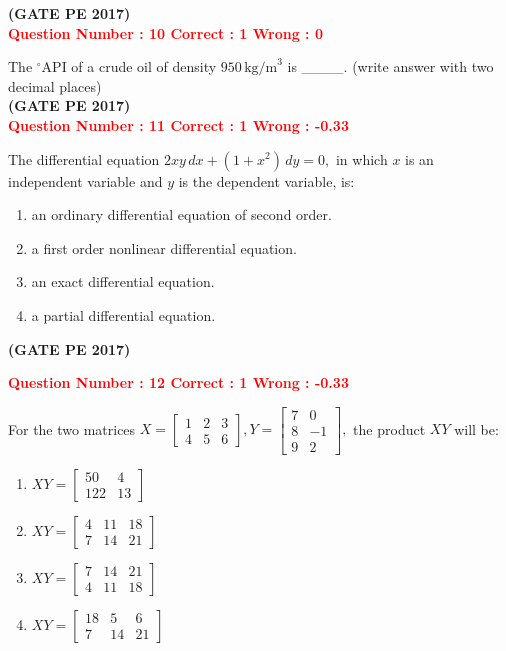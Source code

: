 \documentclass[12pt]{article}
\begin{document}
{\hfill\textbf{(GATE PE 2017)}\\[0.6cm]

\textcolor{red}{\textbf{Question Number : 10 \hfill Correct : 1  Wrong : 0}}

The $^\circ$API of a crude oil of density $950 \, \text{kg/m}^3$ is \_\_\_\_. (write answer with two decimal places)\\

\hfill\textbf{(GATE PE 2017)}\\[0.6cm]

\textcolor{red}{\textbf{Question Number : 11 \hfill Correct : 1  Wrong : -0.33}}

The differential equation 
{\LARGE$
2xy \, dx + (1 + x^2) \, dy = 0,
$}
in which $x$ is an independent variable and $y$ is the dependent variable, is:

\begin{enumerate}[label=(\Alph*)]
    \item an ordinary differential equation of second order.
    \item a first order nonlinear differential equation.
    \item an exact differential equation.
    \item a partial differential equation.
\end{enumerate}
\hfill\textbf{(GATE PE 2017)}\\[0.6cm]

\newpage

\textcolor{red}{\textbf{Question Number : 12 \hfill Correct : 1  Wrong : -0.33}}

For the two matrices 
$ 
X = \begin{bmatrix} 1 & 2 & 3 \\ 4 & 5 & 6 \end{bmatrix}, 
Y = \begin{bmatrix} 7 & 0 \\ 8 & -1 \\ 9 & 2 \end{bmatrix},
$ 
the product $XY$ will be:

\begin{enumerate}[label=(\Alph*)]
    \item $XY = \begin{bmatrix} 50 & 4 \\ 122 & 13 \end{bmatrix}$
    \item $XY = \begin{bmatrix} 4 & 11 & 18 \\ 7 & 14 & 21 \end{bmatrix}$
    \item $XY = \begin{bmatrix} 7 & 14 & 21 \\ 4 & 11 & 18 \end{bmatrix}$
    \item $XY = \begin{bmatrix} 18 & 5 & 6 \\ 7 & 14 & 21 \end{bmatrix}$
\end{enumerate}

}
\end{document}
